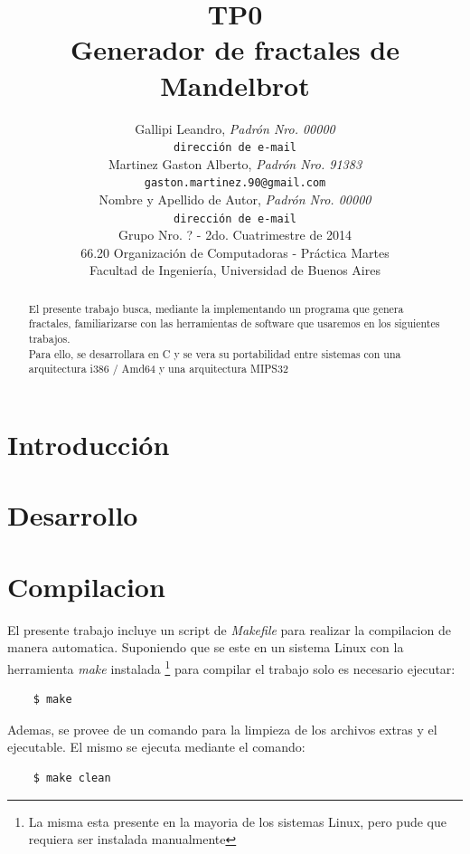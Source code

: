 \documentclass[10pt,spanish,a4paper,openany,notitlepage]{article}
\title{\textbf{TP0}\\ Generador de fractales de Mandelbrot}
\author{Gallipi Leandro, \textit{Padrón Nro. 00000}                    \\
            \texttt{ dirección de e-mail }                                              			\\
            Martinez Gaston Alberto, \textit{Padrón Nro. 91383}                     	\\
            \texttt{gaston.martinez.90@gmail.com}                                            			\\
            Nombre y Apellido de Autor, \textit{Padrón Nro. 00000}                     	\\
            \texttt{ dirección de e-mail }                                              			\\[2.5ex]
            \normalsize{Grupo Nro. ? - 2do. Cuatrimestre de 2014}                       	\\
            \normalsize{66.20 Organización de Computadoras - Práctica Martes}  	\\
            \normalsize{Facultad de Ingeniería, Universidad de Buenos Aires}     	\\
       }
\date{}
\begin{document}
\setcounter{page}{0} %

\maketitle

\thispagestyle{empty}

\begin{abstract}
El presente trabajo busca, mediante la implementando un programa que genera fractales, familiarizarse con las herramientas de software que usaremos en los siguientes trabajos.\\
Para ello, se desarrollara en C y se vera su portabilidad entre sistemas con una arquitectura i386 / Amd64 y una arquitectura MIPS32
\end{abstract}
 
\newpage

\section{Introducción}

\section{Desarrollo}

\section{Compilacion}

El presente trabajo incluye un script de \textit{Makefile} para realizar la compilacion de manera automatica. Suponiendo que se este en un sistema Linux con la herramienta \textit{make} instalada \footnote{La misma esta presente en la mayoria de los sistemas Linux, pero pude que requiera ser instalada manualmente} para compilar el trabajo solo es necesario ejecutar:

\begin{framed}
\begin{verbatim}    $ make\end{verbatim}
\end{framed}

Ademas, se provee de un comando para la limpieza de los archivos extras y el ejecutable. El mismo se ejecuta mediante el comando:

\begin{framed}
\begin{verbatim}    $ make clean\end{verbatim}
\end{framed}
\end{document}
